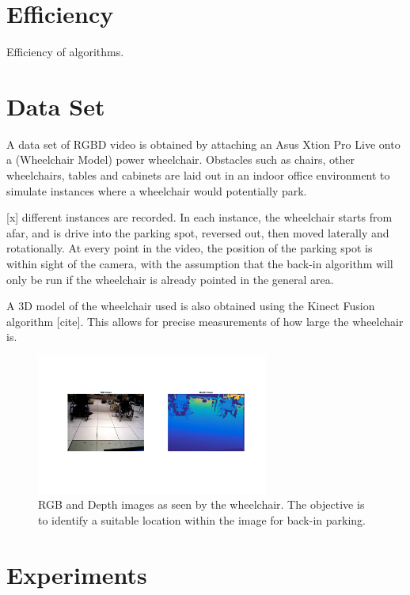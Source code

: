 \section{Efficiency}
Efficiency of algorithms.

\section{Data Set}
\label{sec:rgbddataset}
A data set of RGBD video is obtained by attaching an Asus Xtion Pro Live onto a
(Wheelchair Model) power wheelchair. Obstacles such as chairs, other
wheelchairs, tables and cabinets are laid out in an indoor office environment to
simulate instances where a wheelchair would potentially park.

[x] different instances are recorded. In each instance, the wheelchair starts
from afar, and is drive into the parking spot, reversed out, then moved
laterally and rotationally. At every point in the video, the position of the
parking spot is within sight of the camera, with the assumption that the back-in
algorithm will only be run if the wheelchair is already pointed in the general
area.

A 3D model of the wheelchair used is also obtained using the Kinect Fusion
algorithm [cite]. This allows for precise measurements of how large the
wheelchair is.

\begin{figure}
\centering
\includegraphics[width=3in]{figures/rgbdwheelchair.png}
\caption{RGB and Depth images as seen by the wheelchair. The objective is to
identify a suitable location within the image for back-in parking.}
\label{fig:rgbdwheelchair}
\end{figure}

\section{Experiments}

